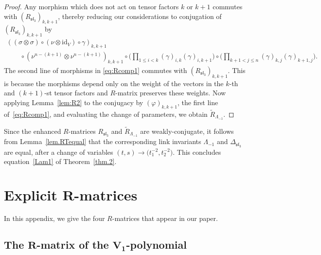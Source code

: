 \documentclass[pdftex]{sigma}
\numberwithin{equation}{section}
\theoremstyle{definition}
\begin{document}
\begin{proof}Any morphism which does not act on tensor factors $k$ or $k+1$ commutes with
$({R}_{\mathfrak{sl}_3})_{k,k+1}$, thereby reducing our considerations to conjugation
of $({R}_{\mathfrak{sl}_3})_{k,k+1}$ by
\begin{gather}
((\sigma \otimes \sigma)
\circ (\nu\otimes \mathrm{id}_V)\circ \gamma)_{k,k+1}\nonumber
\\
\qquad{} \circ(\nu^{n-(k+1)}\otimes \nu^{n-(k+1)})_{k,k+1}\circ
\biggl(\prod_{1\leq i<k}(\gamma)_{i,k}(\gamma)_{i,k+1}\biggr)\circ
\biggl(\prod_{k+1<j \leq n}(\gamma)_{k,j}(\gamma)_{k+1,j}\biggr).\!\!\!\label{eq:Rcomp1}
\end{gather}
The second line of morphisms in \eqref{eq:Rcomp1} commutes with
$(R_{\mathfrak{sl}_3})_{k,k+1}$. This is because the morphisms depend only on the weight of
the vectors in the $k$-th and $(k+1)$-st tensor factors and $R$-matrix preserves
these weights. Now applying Lemma~\ref{lem:R2} to the conjugacy by $(\varphi)_{k,k+1}$,
the first line of~\eqref{eq:Rcomp1}, and evaluating the change of parameters,
we obtain $\tilde{R}_{\Lambda_{-1}}$.
\end{proof}

Since the enhanced $R$-matrices $R_{\mathfrak{sl}_3}$ and $\tilde{R}_{\Lambda_{-1}}$ are
weakly-conjugate, it follows from Lemma~\ref{lem.RTequal} that the corresponding
link invariants $\Lambda_{-1}$ and $\Delta_{\mathfrak{sl}_3}$ are equal, after a change of
variables $(t,s) \to \bigl(t_1^{-2},t_2^{-2}\bigr)$.
This concludes equation~\eqref{Lam1} of Theorem~\ref{thm.2}.

\appendix

\section[Explicit R-matrices]{Explicit $\boldsymbol{R}$-matrices}

In this appendix, we give the four $R$-matrices that appear in our paper.

\subsection[The R-matrix of the V\_1-polynomial]{The $\boldsymbol{R}$-matrix of the $\boldsymbol{V_1}$-polynomial}
\label{sec:app1}
\end{document}
